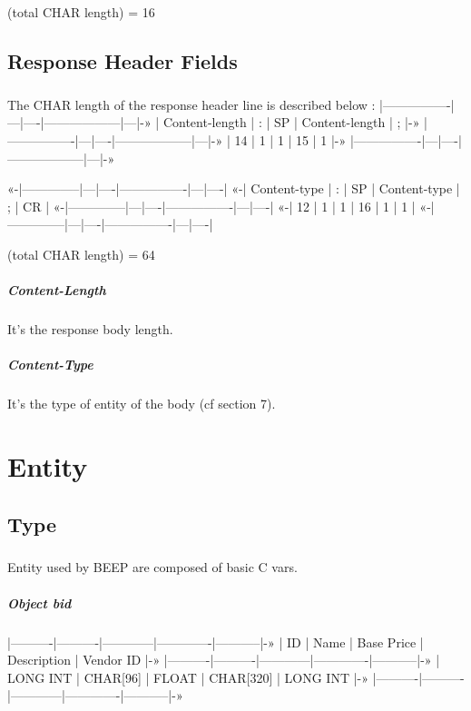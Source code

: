 (total CHAR length) = 16
    \section{Response Header Fields}
        \paragraph{}
The CHAR length of the response header line is described below :
|----------------|---|----|------------------|---|-»
| Content-length | : | SP | {Content-length} | ; |-»
|----------------|---|----|------------------|---|-»
|       14       | 1 |  1 |        15        | 1 |-»
|----------------|---|----|------------------|---|-»

«-|--------------|---|----|----------------|---|----|
«-| Content-type | : | SP | {Content-type} | ; | CR |
«-|--------------|---|----|----------------|---|----|
«-|      12      | 1 |  1 |       16       | 1 |  1 |
«-|--------------|---|----|----------------|---|----|

(total CHAR length) = 64
        \paragraph{Content-Length}
It's the response body length.
        \paragraph{Content-Type}
It's the type of entity of the body (cf section 7).


    \clearpage
\chapter{Entity}
    \section{Type}
        \paragraph{}
Entity used by BEEP are composed of basic C vars.
        \paragraph{Object bid}
|----------|----------|------------|-------------|-----------|-»
|    ID    |   Name   | Base Price | Description | Vendor ID |-»
|----------|----------|------------|-------------|-----------|-»
| LONG INT | CHAR[96] |    FLOAT   |  CHAR[320]  |  LONG INT |-»
|----------|----------|------------|-------------|-----------|-»

